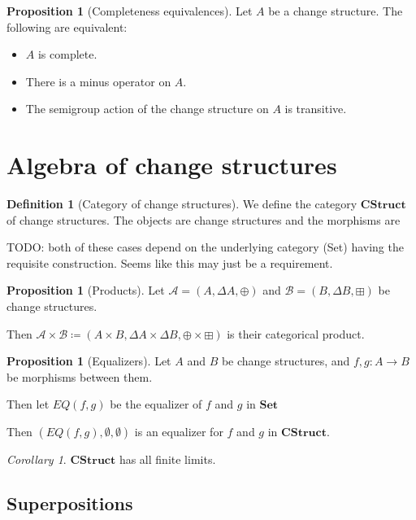 \documentclass[english]{article}
\theoremstyle{plain}
\theoremstyle{definition}
\newtheorem{prop}[thm]{Proposition}
\theoremstyle{remark}
\theoremstyle{remark}
\newtheorem{corollary}[thm]{Corollary}
\theoremstyle{remark}
\theoremstyle{definition}
\newtheorem{defn}{Definition}
\newcommand{\defeq}{\coloneqq}
\newcommand{\cat}[1]{\mathbf{#1}}
\newcommand{\cplus}{\oplus}
\newcommand{\cpluss}{\boxplus}
\newcommand{\cstruct}[3]{(#1,#2,#3)}
\newcommand{\changes}[1]{\Delta #1}
\begin{document}
\begin{prop}[Completeness equivalences]
  Let $A$ be a change structure. The following are equivalent:
  \begin{itemize}
    \item $A$ is complete.
    \item There is a minus operator on $A$.
    \item The semigroup action of the change structure on $A$ is transitive.
  \end{itemize}
\end{prop}

\section{Algebra of change structures}

\begin{defn}[Category of change structures]
  We define the category $\cat{CStruct}$ of change structures. The objects are
  change structures and the morphisms are 
\end{defn}

TODO: both of these cases depend on the underlying category (Set) having the
requisite construction. Seems like this may just be a requirement.

\begin{prop}[Products]
  Let $\mathcal{A} = \cstruct{A}{\changes{A}}{\cplus}$ and $\mathcal{B} =
  \cstruct{B}{\changes{B}}{\cpluss}$ be change structures.

  Then $\mathcal{A} \times \mathcal{B} \defeq \cstruct{A \times B}{\changes{A} \times
  \changes{B}}{\cplus \times \cpluss}$ is their categorical product.
\end{prop}

\begin{prop}[Equalizers]
  Let $A$ and $B$ be change structures, and $f, g: A \rightarrow B$ be morphisms
  between them.

  Then let $EQ(f,g)$ be the equalizer of $f$ and $g$ in $\cat{Set}$

  Then $\cstruct{EQ(f, g)}{\emptyset}{\emptyset}$ is an equalizer for $f$ and $g$
  in $\cat{CStruct}$.
\end{prop}

\begin{corollary}
  $\cat{CStruct}$ has all finite limits.
\end{corollary}

\subsection{Superpositions}
\end{document}

